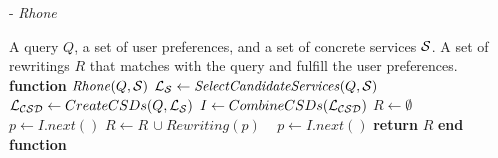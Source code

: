 \begin{algorithm}
\small
\caption{ - \textit{Rhone}}
\label{algo-rhone}
\begin{algorithmic}[1]
\REQUIRE A query $Q$, a set of user preferences, and a set of concrete services $\bigS$.
\ENSURE A set of rewritings $R$ that matches with the query and fulfill the user preferences.
\STATE \textbf{function} $\mathit{Rhone} (Q, \bigS)$
 \STATE  $\bigLS \leftarrow \mathit{SelectCandidateServices}(Q, \bigS)$ \label{rhone:buildPCD}
 \STATE  $\bigLCSD \leftarrow CreateCSDs(Q, \bigLS)$
 \STATE  $I \leftarrow CombineCSDs(\bigLCSD)$
 \STATE $R\leftarrow \emptyset$
 \STATE ~\! 
    \STATE $p \leftarrow I.next()$
  \STATE $R\leftarrow R\,\cup \mathit{Rewriting}(p)$
  \STATE ~\!
   \ENDIF
      \STATE $p \leftarrow I.\mathit{next}()$
 \ENDWHILE
    \STATE \textbf{return} $R$
\STATE \textbf{end function}
\end{algorithmic}
\end{algorithm}
%
